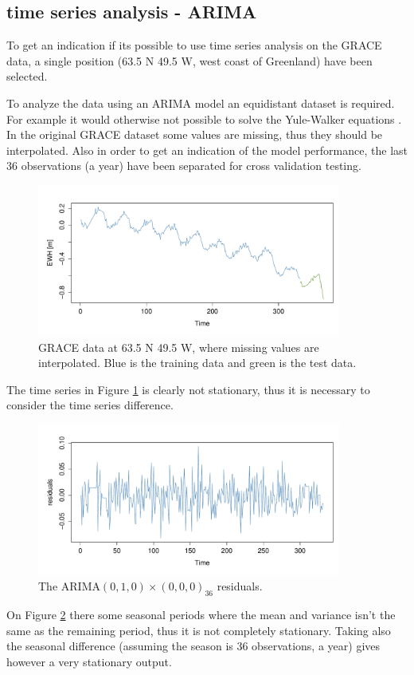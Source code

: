 
\subsection{time series analysis - ARIMA}

To get an indication if its possible to use time series analysis on the GRACE data, a single position (63.5 N 49.5 W, west coast of Greenland) have been selected.

To analyze the data using an ARIMA model an equidistant dataset is required. For example it would otherwise not possible to solve the Yule-Walker equations \cite[s.~122]{time-series-analysis}. In the original GRACE dataset some values are missing, thus they should be interpolated. Also in order to get an indication of the model performance, the last 36 observations (a year) have been separated for cross validation testing.

\begin{figure}[H]
\centering
\includegraphics[height=5cm]{figures/ts-initial-split}
\caption{GRACE data at 63.5 N 49.5 W, where missing values are interpolated. Blue is the training data and green is the  test data.}
\label{fig:ts-initial-split}
\end{figure}

The time series in Figure \ref{fig:ts-initial-split} is clearly not stationary, thus it is necessary to consider the time series difference.
\begin{figure}[H]
\centering
\includegraphics[height=5cm]{figures/ts-residual-i1s0}
\caption{The ARIMA$(0,1,0) \times (0,0,0)_{36}$ residuals.}
\label{fig:ts-residual-i1s0}
\end{figure}
On Figure \ref{fig:ts-residual-i1s0} there some seasonal periods where the mean and variance isn't the same as the remaining period, thus it is not completely stationary. Taking also the seasonal difference (assuming the season is 36 observations, a year) gives however a very stationary output.

